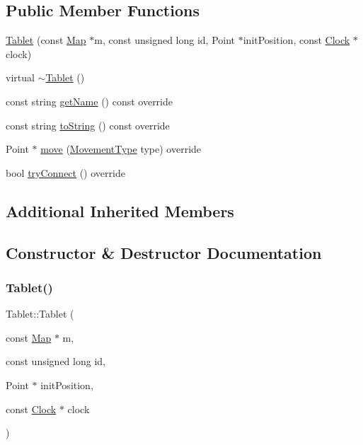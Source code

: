 \subsection*{Public Member Functions}
\begin{DoxyCompactItemize}
\item 
\mbox{\hyperlink{class_tablet_af457c0988b7a768659a284e16be58dc6}{Tablet}} (const \mbox{\hyperlink{class_map}{Map}} $\ast$m, const unsigned long id, Point $\ast$init\+Position, const \mbox{\hyperlink{class_clock}{Clock}} $\ast$clock)
\item 
virtual \mbox{\hyperlink{class_tablet_ac18d46eafd643e66dde81a3fefadab89}{$\sim$\+Tablet}} ()
\item 
const string \mbox{\hyperlink{class_tablet_adc7196aaee1e9714236b7cd8825d5826}{get\+Name}} () const override
\item 
const string \mbox{\hyperlink{class_tablet_a3fae01e7d526699476221c6a686a4fba}{to\+String}} () const override
\item 
Point $\ast$ \mbox{\hyperlink{class_tablet_a0021a8d61f496d84540f675b1cb7d080}{move}} (\mbox{\hyperlink{_movement_type_8h_a8a93b61bc797a7d1907f42796a252493}{Movement\+Type}} type) override
\item 
bool \mbox{\hyperlink{class_tablet_a2328422e1706dfeb2b51a6960e6879f0}{try\+Connect}} () override
\end{DoxyCompactItemize}
\subsection*{Additional Inherited Members}


\subsection{Constructor \& Destructor Documentation}
\mbox{\label{class_tablet_af457c0988b7a768659a284e16be58dc6}} 
\subsubsection{\texorpdfstring{Tablet()}{Tablet()}}
{\footnotesize\ttfamily Tablet\+::\+Tablet (\begin{DoxyParamCaption}\item[{const \mbox{\hyperlink{class_map}{Map}} $\ast$}]{m,  }\item[{const unsigned long}]{id,  }\item[{Point $\ast$}]{init\+Position,  }\item[{const \mbox{\hyperlink{class_clock}{Clock}} $\ast$}]{clock }\end{DoxyParamCaption})\hspace{0.3cm}{\ttfamily [explicit]}}

